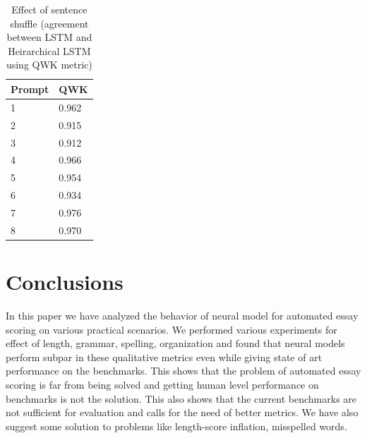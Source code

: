 \documentclass[11pt,a4paper]{article}
\newcommand{\acomment}[1]{{\bf{\color{blue}{{[Aman: #1]}}}}}
\begin{document}
\begin{table}[]
  \centering
  \begin{tabular}{|l|l|}
  \hline
  \textbf{Prompt} & \textbf{QWK} \\ \hline
  1 & 0.962 \\ \hline
  2 & 0.915 \\ \hline
  3 & 0.912 \\ \hline
  4 & 0.966 \\ \hline
  5 & 0.954 \\ \hline
  6 & 0.934 \\ \hline
  7 & 0.976 \\ \hline
  8 & 0.970 \\ \hline
  \end{tabular}
  \caption{Effect of sentence shuffle (agreement between LSTM and Heirarchical LSTM using QWK metric)}
  \label{hlstm}
\end{table}


\section{Conclusions}
In this paper we have analyzed the behavior of neural model for automated essay scoring on various practical scenarios. We performed various experiments for effect of length, grammar, spelling, organization and found that neural models perform subpar in these qualitative metrics even while giving state of art performance on the benchmarks. This shows that the problem of automated essay scoring is far from being solved and getting human level performance on benchmarks is not the solution. This also shows that the current benchmarks are not sufficient for evaluation and calls for the need of better metrics. We have also suggest some solution to problems like length-score inflation, misspelled words.



\acomment{Write this up}




\FloatBarrier



\end{document}
